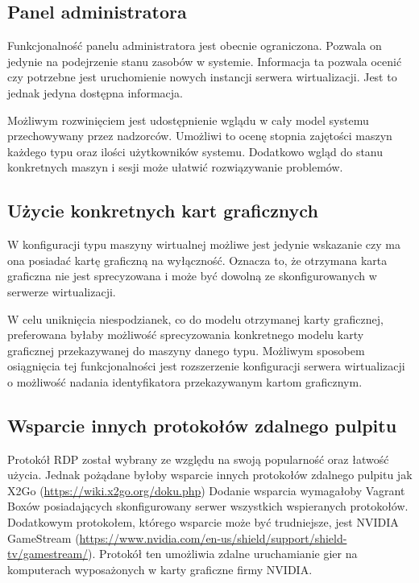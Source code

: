 \documentclass[../podsumowanie.tex]{subfiles}
\begin{document}
\label{future_directions}

\subsection{Panel administratora}

Funkcjonalność panelu administratora jest obecnie ograniczona. Pozwala on jedynie na podejrzenie stanu zasobów w systemie. Informacja ta pozwala ocenić czy potrzebne jest uruchomienie nowych instancji serwera wirtualizacji. Jest to jednak jedyna dostępna informacja.

Możliwym rozwinięciem jest udostępnienie wglądu w cały model systemu przechowywany przez nadzorców. Umożliwi to ocenę stopnia zajętości maszyn każdego typu oraz ilości użytkowników systemu. Dodatkowo wgląd do stanu konkretnych maszyn i sesji może ułatwić rozwiązywanie problemów.

\subsection{Użycie konkretnych kart graficznych}

W konfiguracji typu maszyny wirtualnej możliwe jest jedynie wskazanie czy ma ona posiadać kartę graficzną na wyłączność. Oznacza to, że otrzymana karta graficzna nie jest sprecyzowana i może być dowolną ze skonfigurowanych w serwerze wirtualizacji.

W celu uniknięcia niespodzianek, co do modelu otrzymanej karty graficznej, preferowana byłaby możliwość sprecyzowania konkretnego modelu karty graficznej przekazywanej do maszyny danego typu. Możliwym sposobem osiągnięcia tej funkcjonalności jest rozszerzenie konfiguracji serwera wirtualizacji o możliwość nadania identyfikatora przekazywanym kartom graficznym.

\subsection{Wsparcie innych protokołów zdalnego pulpitu}

Protokół RDP został wybrany ze względu na swoją popularność oraz łatwość użycia. Jednak pożądane byłoby wsparcie innych protokołów zdalnego pulpitu jak X2Go (\url{https://wiki.x2go.org/doku.php})
Dodanie wsparcia wymagałoby Vagrant Boxów posiadających skonfigurowany serwer wszystkich wspieranych protokołów. Dodatkowym protokołem, którego wsparcie może być trudniejsze, jest NVIDIA GameStream (\url{https://www.nvidia.com/en-us/shield/support/shield-tv/gamestream/}).
Protokół ten umożliwia zdalne uruchamianie gier na komputerach wyposażonych w karty graficzne firmy NVIDIA.
\end{document}
